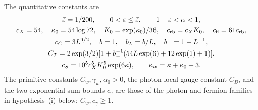 The quantitative constants are
\[
 \begin{gathered}
 \bar\varepsilon=1/200,\qquad
 0<\varepsilon\le\bar\varepsilon,\qquad 1-\varepsilon<\alpha<1,\\
 c_X=54,\quad \kappa_0=54\log72,\quad K_0=\exp(\kappa_0)/36,\quad
 c_{\rm rb}=c_XK_0,\quad c_{\rm fl}=61c_{\rm rb},\\
 c_C=3L^{9/2},\quad b=1,\quad b_L=b/L,\quad b_-=1-L^{-1},\\
 C_T=2\exp(3/2)
       [1+b_-^{-1}(54L\exp(6)+12\exp(1)+1)],\\
 c_S=10^5c_X^5K_0^5\exp(6\kappa),\qquad
 \kappa_w=\kappa+\kappa_0+3 .
 \end{gathered}
\]
The primitive constants \(C_w,\gamma_w,\alpha_0>0\), the photon
local-gauge constant \(C_B\), and the two exponential-sum bounds
\(c_\gamma\) are those of the photon and fermion families in hypothesis~(i) below; \(C_w,c_\gamma\ge1\).


